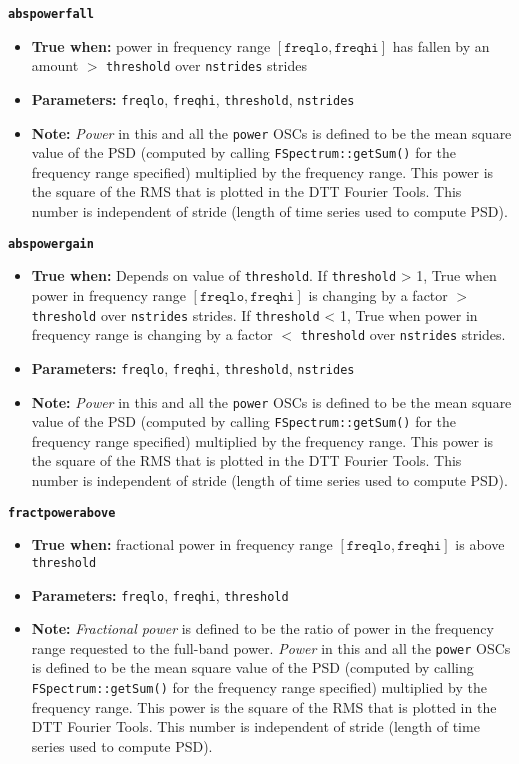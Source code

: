 {{\large\texttt{\textbf{abspowerfall}}}
\begin{itemize}
\item \textbf{True when:} power in frequency range
  $[\mathtt{freqlo}, \mathtt{freqhi}]$ has fallen by an amount
  $>$ \texttt{threshold} over \texttt{nstrides} strides
\item \textbf{Parameters:} \texttt{freqlo}, \texttt{freqhi},
  \texttt{threshold}, \texttt{nstrides}  
\item \textbf{Note:} \textit{Power} in this and all the \texttt{power}
  OSCs is defined to be the mean square value of the PSD
  (computed by calling \texttt{FSpectrum::getSum()} for the
  frequency range specified) multiplied by the frequency range.  This
  power is the square of the RMS that is plotted in the DTT Fourier
  Tools. This number is independent of stride (length of time series
  used to compute PSD). 
\end{itemize}

{\large\texttt{\textbf{abspowergain}}}
\begin{itemize}
\item \textbf{True when:} Depends on value of \texttt{threshold}.  If
  \texttt{threshold} > 1, True when power in frequency range
  $[\mathtt{freqlo}, \mathtt{freqhi}]$ is changing by a factor $>$
  \texttt{threshold} over \texttt{nstrides} strides.  If
  \texttt{threshold} < 1, True when power in frequency range is
  changing by a factor $<$ \texttt{threshold} over \texttt{nstrides}
  strides. 
\item \textbf{Parameters:} \texttt{freqlo}, \texttt{freqhi},
  \texttt{threshold}, \texttt{nstrides}
\item \textbf{Note:} \textit{Power} in this and all the \texttt{power}
  OSCs is defined to be the mean square value of the PSD
  (computed by calling \texttt{FSpectrum::getSum()} for the
  frequency range specified) multiplied by the frequency range.  This
  power is the square of the RMS that is plotted in the DTT Fourier
  Tools. This number is independent of stride (length of time series
  used to compute PSD). 
\end{itemize}

{\large\texttt{\textbf{fractpowerabove}}}

\begin{itemize}
\item \textbf{True when:} fractional power in frequency range
  $[\mathtt{freqlo}, \mathtt{freqhi}]$ is above \texttt{threshold}
\item \textbf{Parameters:} \texttt{freqlo}, \texttt{freqhi}, \texttt{threshold}
\item \textbf{Note:} \textit{Fractional power} is defined to be the
  ratio of power in the frequency range requested to the full-band
  power.  \textit{Power} in this and all the \texttt{power}
  OSCs is defined to be the mean square value of the PSD
  (computed by calling \texttt{FSpectrum::getSum()} for the
  frequency range specified) multiplied by the frequency range. This
  power is the square of the RMS that is plotted in the DTT Fourier
  Tools. This number is independent of stride (length of time series
  used to compute PSD). 
\end{itemize}


}
